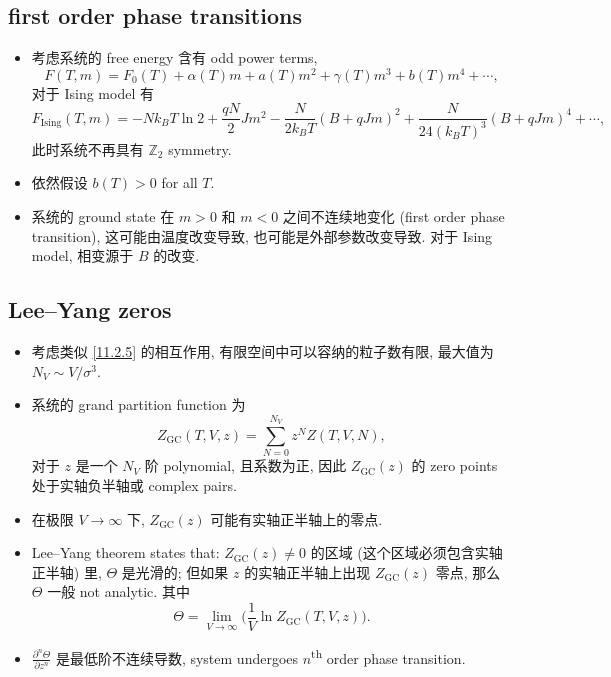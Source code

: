 \subsection{first order phase transitions}
\begin{itemize}
	\item 考虑系统的 free energy 含有 odd power terms,
	\begin{equation}
		F(T, m) = F_0(T) + \alpha(T) m + a(T) m^2 + \gamma(T) m^3 + b(T) m^4 + \cdots,
	\end{equation}
	对于 Ising model 有
	\begin{equation}
		F_\text{Ising}(T, m) = - N k_B T \ln 2 + \frac{q N}{2} J m^2 - \frac{N}{2 k_B T} (B + q J m)^2 + \frac{N}{24 (k_B T)^3} (B + q J m)^4 + \cdots,
	\end{equation}
	此时系统不再具有 $\mathbb{Z}_2$ symmetry.
	
	\item 依然假设 $b(T) > 0$ for all $T$.
	
	\item 系统的 ground state 在 $m > 0$ 和 $m < 0$ 之间不连续地变化 (first order phase transition), 这可能由温度改变导致, 也可能是外部参数改变导致. 对于 Ising model, 相变源于 $B$ 的改变.
\end{itemize}

\subsection{Lee--Yang zeros}
\begin{itemize}
	\item 考虑类似 \eqref{11.2.5} 的相互作用, 有限空间中可以容纳的粒子数有限, 最大值为 $N_V \sim V / \sigma^3$.
	
	\item 系统的 grand partition function 为
	\begin{equation}
		Z_\text{GC}(T, V, z) = \sum_{N = 0}^{N_V} z^N Z(T, V, N),
	\end{equation}
	对于 $z$ 是一个 $N_V$ 阶 polynomial, 且系数为正, 因此 $Z_\text{GC}(z)$ 的 zero points 处于实轴负半轴或 complex pairs.
	
	\item 在极限 $V \rightarrow \infty$ 下, $Z_\text{GC}(z)$ 可能有实轴正半轴上的零点.
	
	\item Lee--Yang theorem states that: $Z_\text{GC}(z) \neq 0$ 的区域 (这个区域必须包含实轴正半轴) 里, $\Theta$ 是光滑的; 但如果 $z$ 的实轴正半轴上出现 $Z_\text{GC}(z)$ 零点, 那么 $\Theta$ 一般 not analytic. 其中
	\begin{equation}
		\Theta = \lim_{V \rightarrow \infty} \Big( \frac{1}{V} \ln Z_\text{GC}(T, V, z) \Big).
	\end{equation}
	
	\item $\frac{\partial^n \Theta}{\partial z^n}$ 是最低阶不连续导数, system undergoes $n$\textsuperscript{th} order phase transition.
\end{itemize}

